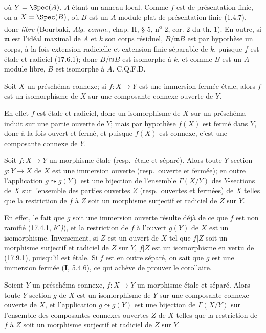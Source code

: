 où $Y=\Spec(A)$, $A$ étant un anneau local. Comme $f$ est de présentation finie, on a $X=\Spec(B)$, où $B$ est un $A$-module plat de présentation finie (1.4.7), donc \emph{libre} (Bourbaki, \emph{Alg. comm.}, chap. II, § 5, n\textsuperscript{o} 2, cor. 2 du th. 1). En outre, si $\mathfrak m$ est l'idéal maximal de $A$ et $k$ son corps résiduel, $B/\mathfrak mB$ est par hypothèse un corps, à la fois extension radicielle et extension finie séparable de $k$, puisque $f$ est étale et radiciel (17.6.1); donc $B/\mathfrak mB$ est isomorphe à $k$, et comme $B$ est un $A$-module libre, $B$ est isomorphe à $A$. C.Q.F.D.

\begin{corollary}[17.9.2]
\label{IV.17.9.2}
Soit $X$ un préschéma connexe; si $f:X\to Y$ est une immersion fermée étale, alors $f$ est un isomorphisme de $X$ sur une composante connexe ouverte de $Y$.
\end{corollary}

En effet $f$ est étale et radiciel, donc un isomorphisme de $X$ sur un préschéma induit sur une partie ouverte de $Y$; mais par hypothèse $f(X)$ est fermé dans $Y$, donc à la fois ouvert et fermé, et puisque $f(X)$ est connexe, c'est une composante connexe de $Y$.

\begin{corollary}[17.9.3]
\label{IV.17.9.3}
Soit $f:X\to Y$ un morphisme étale \textup{(resp.}\ étale et séparé\textup{)}. Alors toute $Y$-section $g:Y\to X$ de $X$ est une immersion ouverte \textup{(resp.}\ ouverte et fermée\textup{)}; en outre l'application $g\leadsto g(Y)$ est une bijection de l'ensemble $\Gamma(X/Y)$ des $Y$-sections de $X$ sur l'ensemble des parties ouvertes $Z$ \textup{(resp.}\ ouvertes et fermées\textup{)} de $X$ telles que la restriction de $f$ à $Z$ soit un morphisme surjectif et radiciel de $Z$ sur $Y$.
\end{corollary}

En effet, le fait que $g$ soit une immersion ouverte résulte déjà de ce que $f$ est non ramifié (17.4.1, \emph{b$''$)}), et la restriction de $f$ à l'ouvert $g(Y)$ de $X$ est un isomorphisme. Inversement, si $Z$ est un ouvert de $X$ tel que $f|Z$ soit un morphisme surjectif et radiciel de $Z$ sur $Y$, $f|Z$ est un isomorphisme en vertu de (17.9.1), puisqu'il est étale. Si $f$ est en outre séparé, on sait que $g$ est une immersion fermée (\textbf{I}, 5.4.6), ce qui achève de prouver le corollaire.

\begin{corollary}[17.9.4]
\label{IV.17.9.4}
Soient $Y$ un préschéma connexe, $f:X\to Y$ un morphisme étale et séparé. Alors toute $Y$-section $g$ de $X$ est un isomorphisme de $Y$ sur une composante connexe ouverte de $X$, et l'application $g\leadsto g(Y)$ est une bijection de $\Gamma(X/Y)$ sur l'ensemble des composantes connexes ouvertes $Z$ de $X$ telles que la restriction de $f$ à $Z$ soit un morphisme surjectif et radiciel de $Z$ sur $Y$.
\end{corollary}

